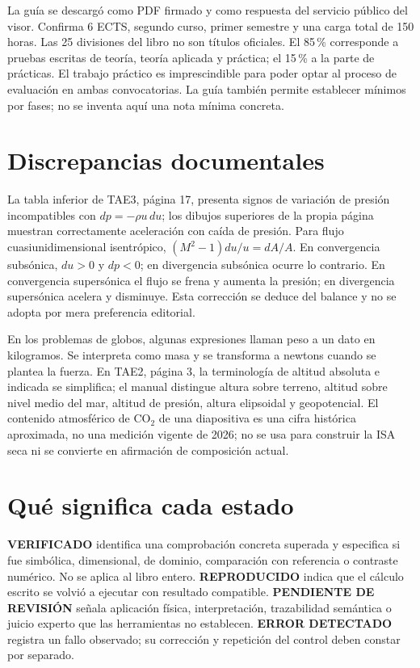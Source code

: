 La guía se descargó como PDF firmado y como respuesta del servicio público del visor. Confirma 6 ECTS, segundo curso, primer semestre y una carga total de 150 horas. Las 25 divisiones del libro no son títulos oficiales. El 85\,\% corresponde a pruebas escritas de teoría, teoría aplicada y práctica; el 15\,\% a la parte de prácticas. El trabajo práctico es imprescindible para poder optar al proceso de evaluación en ambas convocatorias. La guía también permite establecer mínimos por fases; no se inventa aquí una nota mínima concreta.

\section{Discrepancias documentales}
La tabla inferior de TAE3, página 17, presenta signos de variación de presión incompatibles con $dp=-\rho u\,du$; los dibujos superiores de la propia página muestran correctamente aceleración con caída de presión. Para flujo cuasiunidimensional isentrópico, $(M^2-1)du/u=dA/A$. En convergencia subsónica, $du>0$ y $dp<0$; en divergencia subsónica ocurre lo contrario. En convergencia supersónica el flujo se frena y aumenta la presión; en divergencia supersónica acelera y disminuye. Esta corrección se deduce del balance y no se adopta por mera preferencia editorial.

En los problemas de globos, algunas expresiones llaman peso a un dato en kilogramos. Se interpreta como masa y se transforma a newtons cuando se plantea la fuerza. En TAE2, página 3, la terminología de altitud absoluta e indicada se simplifica; el manual distingue altura sobre terreno, altitud sobre nivel medio del mar, altitud de presión, altura elipsoidal y geopotencial. El contenido atmosférico de CO$_2$ de una diapositiva es una cifra histórica aproximada, no una medición vigente de 2026; no se usa para construir la ISA seca ni se convierte en afirmación de composición actual.

\section{Qué significa cada estado}
\textbf{VERIFICADO} identifica una comprobación concreta superada y especifica si fue simbólica, dimensional, de dominio, comparación con referencia o contraste numérico. No se aplica al libro entero. \textbf{REPRODUCIDO} indica que el cálculo escrito se volvió a ejecutar con resultado compatible. \textbf{PENDIENTE DE REVISIÓN} señala aplicación física, interpretación, trazabilidad semántica o juicio experto que las herramientas no establecen. \textbf{ERROR DETECTADO} registra un fallo observado; su corrección y repetición del control deben constar por separado.

